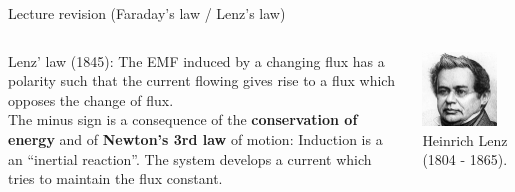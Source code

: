 \begin{frame}{Lecture \summarizedlecture revision (Faraday's law / Lenz's law)}
\begin{columns}
  \begin{column}{0.75\textwidth}
  {\scriptsize
    Lenz' law (1845): The EMF induced by a changing flux has a polarity
    such that the current flowing gives rise to a flux which opposes the change of flux.\\
    \vspace{0.1cm}
    The minus sign is a consequence of the {\bf conservation of energy} and
    of {\bf Newton's 3rd law} of motion: Induction is a an ``inertial reaction''.
    The system develops a current which tries to maintain the flux constant.\\
  }
  \end{column}
  \begin{column}{0.25\textwidth}
    \includegraphics[width=0.83\textwidth]{./images/people/lenz.jpg}\\
    {\tiny Heinrich Lenz (1804 - 1865).}
  \end{column}
\end{columns}

\end{frame}

%
%
%

